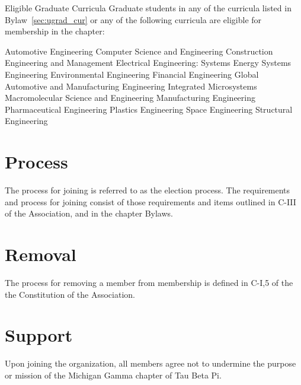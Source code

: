 \begin{enumsubsection}
\begin{enumsubsubsection}
\pagebreak
 \end{enumsubsubsection}
\let\labelenumii\oldenumi
\item{Eligible Graduate Curricula} Graduate students in any of the curricula listed in Bylaw~\ref{sec:ugrad_cur} or any of the following curricula are eligible for membership in the chapter:
\let\oldenumi\labelenumii
\renewcommand{\labelenumii}{\arabic{enumii}.}
\begin{enumsubsubsection}
\itemnotoc Automotive Engineering %
\itemnotoc Computer Science and Engineering
\itemnotoc Construction Engineering and Management
\itemnotoc Electrical Engineering: Systems
\itemnotoc Energy Systems Engineering
\itemnotoc Environmental Engineering
\itemnotoc Financial Engineering
\itemnotoc Global Automotive and Manufacturing Engineering
\itemnotoc Integrated Microsystems
\itemnotoc Macromolecular Science and Engineering
\itemnotoc Manufacturing Engineering
\itemnotoc Pharmaceutical Engineering
\itemnotoc Plastics Engineering
\itemnotoc Space Engineering  %
\itemnotoc Structural Engineering
\end{enumsubsubsection}
\let\labelenumii\oldenumi
\end{enumsubsection}

\section{Process} The process for joining is referred to as the election process. The requirements and process for joining consist of those requirements and items outlined in C-III of the Association, and in the chapter Bylaws.

\section{Removal} The process for removing a member from membership is defined in C-I,5 of the the Constitution of the Association. %

\section{Support} Upon joining the organization, all members agree not to undermine the purpose or mission of the Michigan Gamma chapter of Tau Beta Pi.
